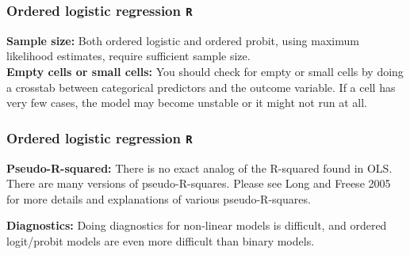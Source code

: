 \documentclass[00-GLMregslides.tex]{subfiles}
\begin{document}
\begin{frame}[fragile]
	\frametitle{Ordered logistic regression \texttt{R} }
	\Large
\textbf{Sample size:} Both ordered logistic and ordered probit, using maximum likelihood estimates, require sufficient sample size.
\\
\textbf{Empty cells or small cells:} You should check for empty or small cells by doing a crosstab between categorical predictors and the outcome variable. If a cell has very few cases, the model may become unstable or it might not run at all.
\end{frame}

\begin{frame}[fragile]
	\frametitle{Ordered logistic regression \texttt{R} }
	\Large
\textbf{Pseudo-R-squared: }There is no exact analog of the R-squared found in OLS. There are many versions of pseudo-R-squares. Please see Long and Freese 2005 for more details and explanations of various pseudo-R-squares.



\textbf{Diagnostics:} Doing diagnostics for non-linear models is difficult, and ordered logit/probit models are even more difficult than binary models.
\end{frame}


\end{document}
